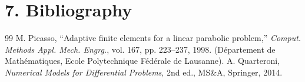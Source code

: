 \documentclass[
  11pt,
]{article}
\begin{document}
\section{7. Bibliography}

\begin{thebibliography}{99}
M. Picasso, ``Adaptive finite elements for a linear parabolic problem,'' \emph{Comput. Methods Appl. Mech. Engrg.}, vol. 167, pp. 223--237, 1998. (Département de Mathématiques, Ecole Polytechnique Fédérale de Lausanne).
A. Quarteroni, \emph{Numerical Models for Differential Problems}, 2nd ed., MS\&A, Springer, 2014.
\end{thebibliography}
\end{document}
